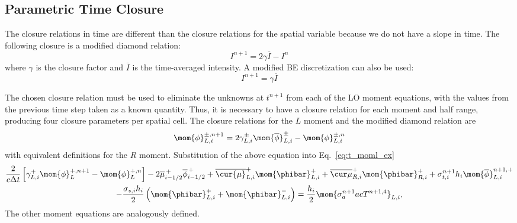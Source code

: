 \subsection{Parametric Time Closure}
%
The closure relations in time are different than the closure relations for the spatial
variable because we do not have a slope in time.  The following closure is a modified diamond
relation:
\begin{equation}\label{eq:tc_diam}
    I^{n+1} = 2\gamma \overline{I} - I^{n}
\end{equation}
where $\gamma$ is the closure factor and $\overline{I}$ is the time-averaged
intensity.  A modified BE discretization can also be used:
\begin{equation}\label{eq:tc_avg}
    I^{n+1} = \gamma \overline{I}
\end{equation}

The chosen closure relation must be used to eliminate the unknowns at $t^{n+1}$ from each
of the LO moment equations, with the values from the previous time step taken as a known quantity.  Thus, it is necessary to have a closure relation for each moment and half
range, producing four closure parameters per spatial cell.  The closure relations for the
$L$ moment and the modified diamond relation are
\begin{equation}\label{eq:tc_diam_l}
    \mom{\phi}_{L,i}^{\pm,n+1} = 2 \gamma_{L,i}^{\pm}\mom{\overline\phi}_{L,i}^{\pm} -
    \mom{\phi}_{L,i}^{\pm,n}
\end{equation}
with equivalent definitions for the $R$ moment.  Substitution of the above equation into
Eq.~\eqref{eq:t_moml_ex}
\begin{multline}
    \frac{2}{c\Delta t}\left[ \gamma_{L,i}^{+} \mom{\phi}_L^{+,n+1} - \mom{\phi}_L^{+,n} \right]
    -2\overline {\mu}_{i-1/2}^{\,+} \overline \phi_{i-1/2}^{\,+} + \overline{\cur {\mu}}_{L,i}^{+}
  \mom{\phibar}_{L,i}^{+}
  +  \overline{\cur\mu}_{R,i}^{+}
  \mom{\phibar}_{R,i}^{+} +  \sigma_{t,i}^{n+1} h_i 
  \mom{\overline\phi}_{L,i}^{n+1,+} \\-  \frac{\sigma_{s,i} h_i}{2} \left( \mom{\phibar}_{L,i}^{+} +
  \mom{\phibar}_{L,i}^{-}\right) = \frac{h_i}{2} \mom{\sigma_a^{n+1} a c T^{n+1,4}}_{L,i},
\end{multline}
The other moment equations are analogously defined.  


